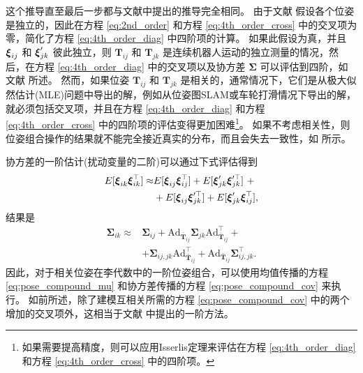 这个推导直至最后一步都与文献\cite{barfoot2014associating}中提出的推导完全相同。 
由于文献 \cite{barfoot2014associating} 假设各个位姿是独立的，因此在方程 \eqref{eq:2nd_order} 和方程 \eqref{eq:4th_order_cross} 中的交叉项为零，简化了方程 \eqref{eq:4th_order_diag} 中四阶项的计算。 
如果此假设为真，并且 $\boldsymbol{\xi}_{ij}$ 和 $\boldsymbol{\xi}^\prime_{jk}$ 彼此独立，则 $\mathbf{T}_{ij}$ 和 $\mathbf{T}_{jk}$ 是连续机器人运动的独立测量的情况，然后，在方程 \eqref{eq:4th_order_diag} 中的交叉项以及协方差 $\boldsymbol{\Sigma}$ 可以评估到四阶，如文献 \cite{barfoot2014associating} 所述。 
然而，如果位姿 $\mathbf{T}_{ij}$ 和 $\mathbf{T}_{jk}$ 是相关的，通常情况下，它们是从极大似然估计(\ac{MLE})问题中导出的解，例如从位姿图SLAM或车轮打滑情况下导出的解，就必须包括交叉项，并且在方程 \eqref{eq:4th_order_diag} 和方程 \eqref{eq:4th_order_cross} 中的四阶项的评估变得更加困难\footnote{如果需要提高精度，则可以应用Isserlis定理来评估在方程 \eqref{eq:4th_order_diag} 和方程 \eqref{eq:4th_order_cross} 中的四阶项。}。 
如果不考虑相关性，则位姿组合操作的结果就不能完全接近真实的分布，而且会失去一致性，如  所示。 

协方差的一阶估计(扰动变量的二阶)可以通过下式评估得到
\begin{align}
    E[\boldsymbol{\xi}_{ik}\boldsymbol{\xi}^\top_{ik}] \approx &E [ \boldsymbol{\xi}_{ij}\boldsymbol{\xi}^\top_{ij} ] + E[\boldsymbol{\xi}^\prime_{jk}\boldsymbol{\xi}^{\prime\top}_{jk}] ~+  \\       
    &+ E[\boldsymbol{\xi}_{ij}\boldsymbol{\xi}^{\prime\top}_{jk}] + E[\boldsymbol{\xi}^\prime_{jk}\boldsymbol{\xi}^\top_{ij}], \nonumber
\end{align} 
结果是
\begin{align}
    \boldsymbol{\Sigma}_{ik} \approx &\boldsymbol{\Sigma}_{ij} + \mathrm{Ad}_{\bar{\mathbf{T}}_{ij}} \boldsymbol{\Sigma}_{jk} \mathrm{Ad}_{\bar{\mathbf{T}}_{ij}}^\top + \label{eq:pose_compound_cov}\\ &+\boldsymbol{\Sigma}_{ij,jk} \mathrm{Ad}_{\bar{\mathbf{T}}_{ij}}^\top +\mathrm{Ad}_{\bar{\mathbf{T}}_{ij}} \boldsymbol{\Sigma}_{ij,jk}^\top . \nonumber
\end{align}
因此，对于相关位姿在李代数中的一阶位姿组合，可以使用均值传播的方程 \eqref{eq:pose_compound_mu} 和协方差传播的方程 \eqref{eq:pose_compound_cov} 来执行。 
如前所述，除了建模互相关所需的方程 \eqref{eq:pose_compound_cov} 中的两个增加的交叉项外，这相当于文献 \cite{barfoot2014associating} 中提出的一阶方法。 


